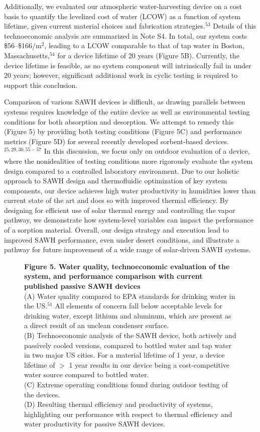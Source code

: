 \documentclass[11pt]{article}
\newcommand{\figbox}[1]{%
  \fbox{\parbox[c][#1][c]{0.92\textwidth}{\centering\itshape [figure image]}}}
\begin{document}
Additionally, we evaluated our atmospheric water-harvesting device on a cost basis to quantify the levelized cost of water (LCOW) as a function of system lifetime, given current material choices and fabrication strategies.$^{53}$ Details of this technoeconomic analysis are summarized in Note S4. In total, our system costs \$56--\$166/m$^{2}$, leading to a LCOW comparable to that of tap water in Boston, Massachusetts,$^{54}$ for a device lifetime of 20 years (Figure 5B). Currently, the device lifetime is feasible, as no system component will intrinsically fail in under 20 years; however, significant additional work in cyclic testing is required to support this conclusion.

Comparison of various SAWH devices is difficult, as drawing parallels between systems requires knowledge of the entire device as well as environmental testing conditions for both absorption and desorption. We attempt to remedy this (Figure 5) by providing both testing conditions (Figure 5C) and performance metrics (Figure 5D) for several recently developed sorbent-based devices.$^{25,29,30,55-57}$ In this discussion, we focus only on outdoor evaluation of a device, where the nonidealities of testing conditions more rigorously evaluate the system design compared to a controlled laboratory environment. Due to our holistic approach to SAWH design and thermofluidic optimization of key system components, our device achieves high water productivity in humidities lower than current state of the art and does so with improved thermal efficiency. By designing for efficient use of solar thermal energy and controlling the vapor pathway, we demonstrate how system-level variables can impact the performance of a sorption material. Overall, our design strategy and execution lead to improved SAWH performance, even under desert conditions, and illustrate a pathway for future improvement of a wide range of solar-driven SAWH systems.

\begin{figure}[!ht]
\centering
\figbox{7cm}
\caption*{\textbf{Figure 5. Water quality, technoeconomic evaluation of the system, and performance comparison with current published passive SAWH devices}\\
(A) Water quality compared to EPA standards for drinking water in the US.$^{51}$ All elements of concern fall below acceptable levels for drinking water, except lithium and aluminum, which are present as a direct result of an unclean condenser surface.\\
(B) Technoeconomic analysis of the SAWH device, both actively and passively cooled versions, compared to bottled water and tap water in two major US cities. For a material lifetime of 1 year, a device lifetime of $>$ 1 year results in our device being a cost-competitive water source compared to bottled water.\\
(C) Extreme operating conditions found during outdoor testing of the devices.\\
(D) Resulting thermal efficiency and productivity of systems, highlighting our performance with respect to thermal efficiency and water productivity for passive SAWH devices.}
\end{figure}
\end{document}
